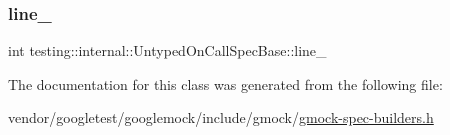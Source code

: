 \subsubsection{\texorpdfstring{line\+\_\+}{line\_}}
{\footnotesize\ttfamily int testing\+::internal\+::\+Untyped\+On\+Call\+Spec\+Base\+::line\+\_\+\hspace{0.3cm}{\ttfamily [protected]}}



The documentation for this class was generated from the following file\+:\begin{DoxyCompactItemize}
\item 
vendor/googletest/googlemock/include/gmock/\hyperlink{gmock-spec-builders_8h}{gmock-\/spec-\/builders.\+h}\end{DoxyCompactItemize}
